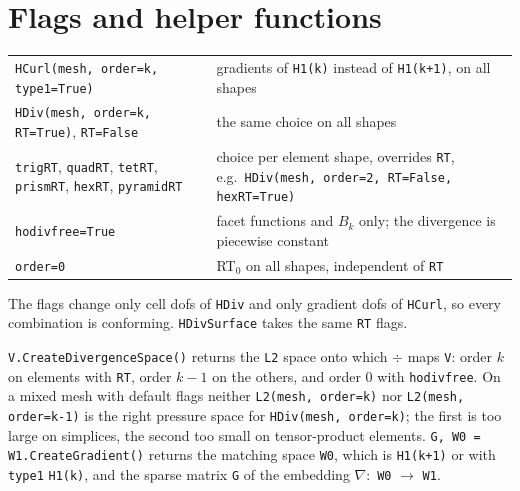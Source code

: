 \documentclass[10pt,a4paper]{article}
\newcommand{\code}[1]{\texttt{#1}}
\begin{document}
\section{Flags and helper functions}

\begin{center}\small
\renewcommand{\arraystretch}{1.15}
\begin{tabular}{@{}>{\raggedright}p{6.4cm}>{\raggedright\arraybackslash}p{9.8cm}@{}}\toprule
\code{HCurl(mesh, order=k, type1=True)} & gradients of \code{H1(k)} instead of \code{H1(k+1)}, on all shapes\\
\code{HDiv(mesh, order=k, RT=True)}, \code{RT=False} & the same choice on all shapes\\
\code{trigRT}, \code{quadRT}, \code{tetRT}, \code{prismRT}, \code{hexRT}, \code{pyramidRT} & choice per element shape, overrides \code{RT}, e.g.\ \code{HDiv(mesh, order=2, RT=False, hexRT=True)}\\
\code{hodivfree=True} & facet functions and $B_k$ only; the divergence is piecewise constant\\
\code{order=0} & RT$_0$ on all shapes, independent of \code{RT}\\\bottomrule
\end{tabular}
\end{center}
The flags change only cell dofs of \code{HDiv} and only gradient dofs of \code{HCurl}, so every combination is conforming. \code{HDivSurface} takes the same \code{RT} flags.

\code{V.CreateDivergenceSpace()} returns the \code{L2} space onto which $\div$ maps \code{V}: order $k$ on elements with \code{RT}, order $k-1$ on the others, and order $0$ with \code{hodivfree}. On a mixed mesh with default flags neither \code{L2(mesh, order=k)} nor \code{L2(mesh, order=k-1)} is the right pressure space for \code{HDiv(mesh, order=k)}; the first is too large on simplices, the second too small on tensor-product elements.
\code{G, W0 = W1.CreateGradient()} returns the matching space \code{W0}, which is \code{H1(k+1)} or with \code{type1} \code{H1(k)}, and the sparse matrix \code{G} of the embedding $\nabla:$ \code{W0} $\to$ \code{W1}.
\end{document}

